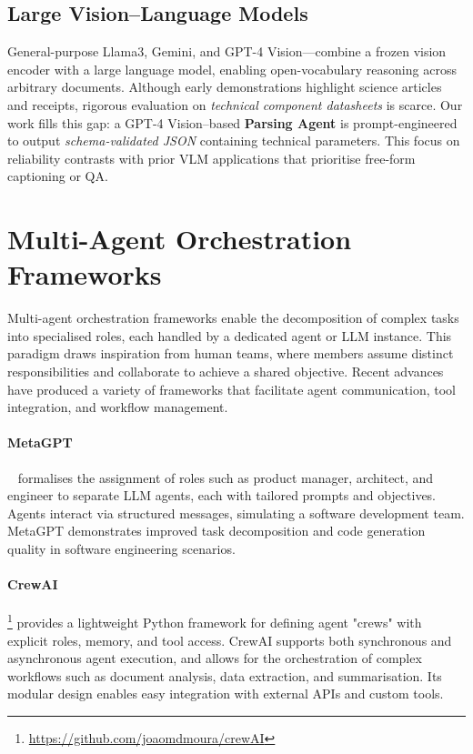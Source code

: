 \subsection{Large Vision--Language Models}
General-purpose Llama3, Gemini, and GPT-4 Vision—combine a frozen vision
encoder with a large language model, enabling open-vocabulary reasoning across
arbitrary documents.
Although early demonstrations highlight science articles and receipts,
rigorous evaluation on \emph{technical component datasheets} is scarce.
Our work fills this gap: a GPT-4 Vision–based \textbf{Parsing Agent} is
prompt-engineered to output \emph{schema-validated JSON} containing technical parameters.
This focus on reliability contrasts with prior VLM
applications that prioritise free-form captioning or QA.

\section{Multi-Agent Orchestration Frameworks}
Multi-agent orchestration frameworks enable the decomposition of complex tasks into specialised roles, each handled by a dedicated agent or LLM instance. This paradigm draws inspiration from human teams, where members assume distinct responsibilities and collaborate to achieve a shared objective. Recent advances have produced a variety of frameworks that facilitate agent communication, tool integration, and workflow management.

\paragraph{MetaGPT}~\cite{hong2023metagpt} formalises the assignment of roles such as product manager, architect, and engineer to separate LLM agents, each with tailored prompts and objectives. Agents interact via structured messages, simulating a software development team. MetaGPT demonstrates improved task decomposition and code generation quality in software engineering scenarios.

\paragraph{CrewAI}\footnote{\url{https://github.com/joaomdmoura/crewAI}} provides a lightweight Python framework for defining agent "crews" with explicit roles, memory, and tool access. CrewAI supports both synchronous and asynchronous agent execution, and allows for the orchestration of complex workflows such as document analysis, data extraction, and summarisation. Its modular design enables easy integration with external APIs and custom tools.

